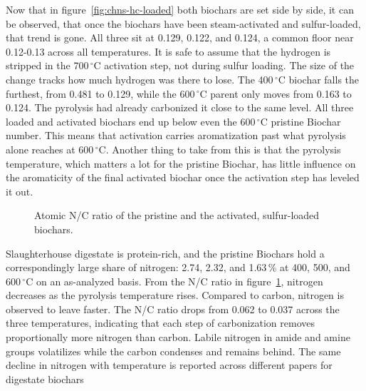 Now that in figure~\ref{fig:chns-hc-loaded} both biochars are set side by side, it can be observed, that once the biochars have been steam-activated and sulfur-loaded, that trend is gone. All three sit at 0.129, 0.122, and 0.124, a common floor near 0.12-0.13 across all temperatures. It is safe to assume that the hydrogen is stripped in the 700\,$^{\circ}$C activation step, not during sulfur loading. The size of the change tracks how much hydrogen was there to lose. The 400\,$^{\circ}$C biochar falls the furthest, from 0.481 to 0.129, while the 600\,$^{\circ}$C parent only moves from 0.163 to 0.124. The pyrolysis had already carbonized it close to the same level. All three loaded and activated biochars end up below even the 600\,$^{\circ}$C pristine Biochar number. This means that activation carries aromatization past what pyrolysis alone reaches at 600\,$^{\circ}$C. Another thing to take from this is that the pyrolysis temperature, which matters a lot for the pristine Biochar, has little influence on the aromaticity of the final activated biochar once the activation step has leveled it out.
\clearpage
\begin{figure}[ht]
\centering
{}
\caption{Atomic N/C ratio of the pristine and the activated, sulfur-loaded biochars.}
\label{fig:chns-nc}
\end{figure}


Slaughterhouse digestate is protein-rich, and the pristine Biochars hold a correspondingly large share of nitrogen: 2.74, 2.32, and 1.63\,\% at 400, 500, and 600\,$^{\circ}$C on an as-analyzed basis. From the N/C ratio in figure~\ref{fig:chns-nc}, nitrogen decreases as the pyrolysis temperature rises. Compared to carbon, nitrogen is observed to leave faster. The N/C ratio drops from 0.062 to 0.037 across the three temperatures, indicating that each step of carbonization removes proportionally more nitrogen than carbon.  Labile nitrogen in amide and amine groups volatilizes while the carbon condenses and remains behind. The same decline in nitrogen with temperature is reported across different papers for digestate biochars \cite{kujawska-2026, tomczyk-2020}
 
